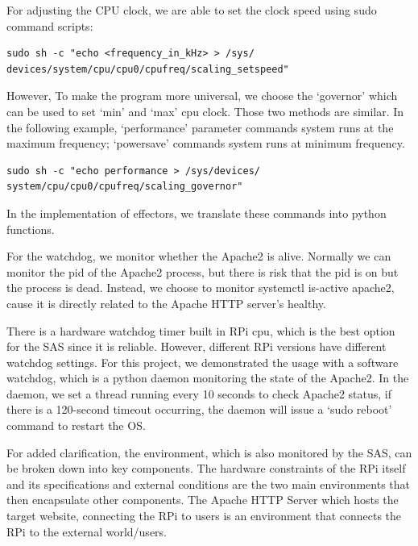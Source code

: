 \documentclass[conference]{IEEEtran}
\begin{document}
\begin{itemize}
          \noindent
          \begin{flushleft}
              For adjusting the CPU clock, we are able to set the clock speed using sudo command scripts:

              {\footnotesize
              \begin{verbatim}
sudo sh -c "echo <frequency_in_kHz> > /sys/
devices/system/cpu/cpu0/cpufreq/scaling_setspeed"
\end{verbatim}
              }

              However, To make the program more universal, we choose the ‘governor’ which can be used to set ‘min’ and ‘max’ cpu clock. Those two methods are similar. In the following example, ‘performance’ parameter commands system runs at the maximum frequency; ‘powersave’ commands system runs at minimum frequency.

                  {\footnotesize
                      \begin{verbatim}
sudo sh -c "echo performance > /sys/devices/
system/cpu/cpu0/cpufreq/scaling_governor"
\end{verbatim}
                  }

              In the implementation of effectors, we translate these commands into python functions.
          \end{flushleft}

          For the watchdog, we monitor whether the Apache2 is alive. Normally we can monitor the pid of the Apache2 process, but there is risk that the pid is on but the process is dead. Instead, we choose to monitor systemctl is-active apache2, cause it is directly related to the Apache HTTP server's healthy.
          
          There is a hardware watchdog timer built in RPi cpu, which is the best option for the SAS since it is reliable. However, different RPi versions have different watchdog settings. For this project, we demonstrated the usage with a software watchdog, which is a python daemon monitoring the state of the Apache2. In the daemon, we set a thread running every 10 seconds to check Apache2 status, if there is a 120-second timeout occurring, the daemon will issue a ‘sudo reboot’ command to restart the OS.

\end{itemize}

For added clarification, the environment, which is also monitored by the SAS, can be broken down into key components. The hardware constraints of the RPi itself and its specifications and external conditions are the two main environments that then encapsulate other components. The Apache HTTP Server which hosts the target website, connecting the RPi to users is an environment that connects the RPi to the external world/users.
\end{document}

